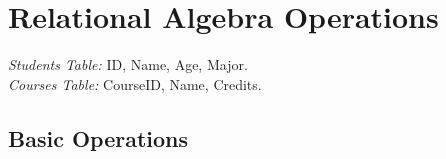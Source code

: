 \section*{Relational Algebra Operations}

\vspace{-0.1cm}

\begin{center}
\noindent
\textit{Students Table:} ID, Name, Age, Major. \\
\textit{Courses Table:} CourseID, Name, Credits.
\end{center}


\vspace{-0.7cm}
\subsection*{Basic Operations}
\vspace{-0.1cm}


